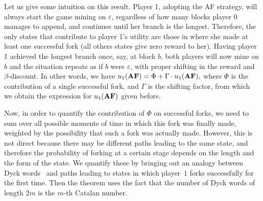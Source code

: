 \documentclass[a4paper,english,cleveref, autoref,numberwithinsect]{lipics-v2019}
\newcommand{\af}{\text{\rm AF}}
\newcommand{\baf}{\text{\rm {\bf AF}}}
\begin{document}
Let us give some intuition on this result. 
Player 1, adopting the AF strategy, will always start the game mining on $\varepsilon$, regardless of how many blocks player 0 manages to append, and continues until her branch is the longest. Therefore, the only states that contribute to player 1's utility are those in where she made at least one successful fork (all others states give zero reward to her). Having player 1 achieved the longest branch once, say, at block $b$, both players will now mine on $b$ and the situation repeats as if $b$ were $\varepsilon$, with proper shifting in the reward and $\beta$-discount. In other words, we have
$u_1(\baf) = \Phi + \Gamma\cdot u_1(\baf),$
where $\Phi$ is the contribution of a single successful fork, and $\Gamma$ is the shifting factor, from which we obtain the expression for $u_1(\baf)$ given before. 

Now, in order to quantify the contribution of $\Phi$ on successful forks, we need to sum over all possible moments of time in which this fork was finally made, weighted by the possibility 
that such a fork was actually made. However, this is not direct because there may be different paths leading to the same state, and therefore the probability of forking at a certain stage  
depends on the length and the form of the state. We quantify these by bringing out an analogy between Dyck words~\cite{stanley2015catalan} and paths leading to states in which 
player~$1$ forks successfully for the first time. Then the theorem 
uses the fact that the number of Dyck words of length $2m$ is the $m$-th Catalan number. 

\end{document}
